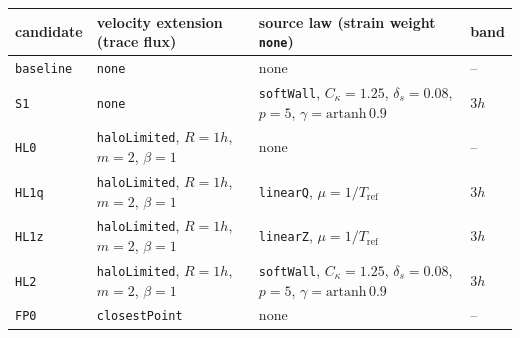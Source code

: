 \begin{tabular}{@{}llll@{}}
  \toprule
  candidate & velocity extension (trace flux) & source law (strain weight \texttt{none}) & band\\
  \midrule
\texttt{baseline} & \texttt{none} & none & --\\
\texttt{S1} & \texttt{none} & \texttt{softWall}, $C_\kappa=1.25$, $\delta_s=0.08$, $p=5$, $\gamma=\mathrm{artanh}\,0.9$ & $3h$\\
\texttt{HL0} & \texttt{haloLimited}, $R=1h$, $m=2$, $\beta=1$ & none & --\\
\texttt{HL1q} & \texttt{haloLimited}, $R=1h$, $m=2$, $\beta=1$ & \texttt{linearQ}, $\mu = 1/T_\mathrm{ref}$ & $3h$\\
\texttt{HL1z} & \texttt{haloLimited}, $R=1h$, $m=2$, $\beta=1$ & \texttt{linearZ}, $\mu = 1/T_\mathrm{ref}$ & $3h$\\
\texttt{HL2} & \texttt{haloLimited}, $R=1h$, $m=2$, $\beta=1$ & \texttt{softWall}, $C_\kappa=1.25$, $\delta_s=0.08$, $p=5$, $\gamma=\mathrm{artanh}\,0.9$ & $3h$\\
\texttt{FP0} & \texttt{closestPoint} & none & --\\
  \bottomrule
\end{tabular}
